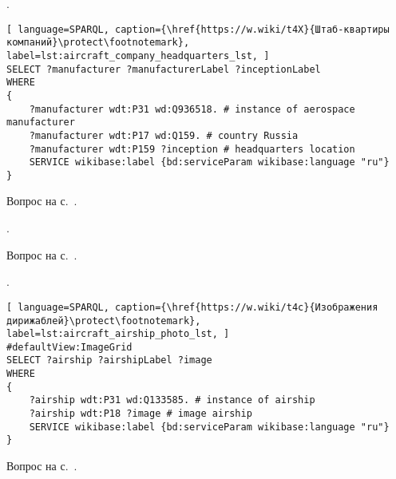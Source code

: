\begin{task}
    \label{answer:aircraft_company_headquarters}
    . 
    
	\begin{lstlisting}[ language=SPARQL, caption={\href{https://w.wiki/t4X}{Штаб-квартиры компаний}\protect\footnotemark}, label=lst:aircraft_company_headquarters_lst, ]
SELECT ?manufacturer ?manufacturerLabel ?inceptionLabel
WHERE
{
    ?manufacturer wdt:P31 wd:Q936518. # instance of aerospace manufacturer
  	?manufacturer wdt:P17 wd:Q159. # country Russia
  	?manufacturer wdt:P159 ?inception # headquarters location
    SERVICE wikibase:label {bd:serviceParam wikibase:language "ru"}
}
\end{lstlisting}
    
    \small{Вопрос на с.~\pageref{aircraft_question_3}.}
\end{task}

\begin{task}
    \label{answer:aircraft_question_airship}
    . 
    
    \small{Вопрос на с.~\pageref{aircraft_question_4}.}
\end{task}

\begin{task}
    \label{answer:aircraft_question_airship_2}
    . 
    
	\begin{lstlisting}[ language=SPARQL, caption={\href{https://w.wiki/t4c}{Изображения дирижаблей}\protect\footnotemark}, label=lst:aircraft_airship_photo_lst, ]
#defaultView:ImageGrid
SELECT ?airship ?airshipLabel ?image
WHERE
{
    ?airship wdt:P31 wd:Q133585. # instance of airship
  	?airship wdt:P18 ?image # image airship
    SERVICE wikibase:label {bd:serviceParam wikibase:language "ru"}
}
\end{lstlisting}
    
    \small{Вопрос на с.~\pageref{aircraft_question_5}.}
\end{task}

